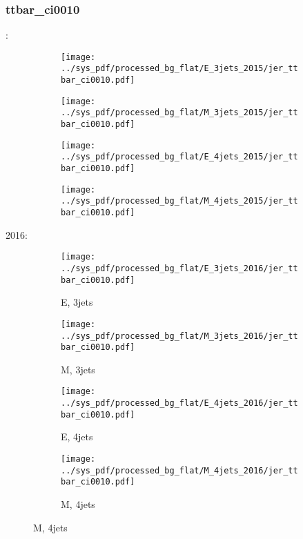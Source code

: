 \documentclass{beamer}
\begin{document}
\begin{frame}
\frametitle{ttbar_ci0010}
\fontsize{5}{1}:
\begin{figure}
\centering
\begin{subfigure}[b]{0.24\textwidth}
\texttt{[image: ../sys\_pdf/processed\_bg\_flat/E\_3jets\_2015/jer\_ttbar\_ci0010.pdf]}
\end{subfigure}
\begin{subfigure}[b]{0.24\textwidth}
\texttt{[image: ../sys\_pdf/processed\_bg\_flat/M\_3jets\_2015/jer\_ttbar\_ci0010.pdf]}
\end{subfigure}
\begin{subfigure}[b]{0.24\textwidth}
\texttt{[image: ../sys\_pdf/processed\_bg\_flat/E\_4jets\_2015/jer\_ttbar\_ci0010.pdf]}
\end{subfigure}
\begin{subfigure}[b]{0.24\textwidth}
\texttt{[image: ../sys\_pdf/processed\_bg\_flat/M\_4jets\_2015/jer\_ttbar\_ci0010.pdf]}
\end{subfigure}
\end{figure}
2016:
\begin{figure}
\centering
\begin{subfigure}[b]{0.24\textwidth}
\texttt{[image: ../sys\_pdf/processed\_bg\_flat/E\_3jets\_2016/jer\_ttbar\_ci0010.pdf]}
\captionsetup{font=tiny}
\caption{E, 3jets}
\end{subfigure}
\begin{subfigure}[b]{0.24\textwidth}
\texttt{[image: ../sys\_pdf/processed\_bg\_flat/M\_3jets\_2016/jer\_ttbar\_ci0010.pdf]}
\captionsetup{font=tiny}
\caption{M, 3jets}
\end{subfigure}
\begin{subfigure}[b]{0.24\textwidth}
\texttt{[image: ../sys\_pdf/processed\_bg\_flat/E\_4jets\_2016/jer\_ttbar\_ci0010.pdf]}
\captionsetup{font=tiny}
\caption{E, 4jets}
\end{subfigure}
\begin{subfigure}[b]{0.24\textwidth}
\texttt{[image: ../sys\_pdf/processed\_bg\_flat/M\_4jets\_2016/jer\_ttbar\_ci0010.pdf]}
\captionsetup{font=tiny}
\caption{M, 4jets}
\end{subfigure}
\end{figure}
\end{frame}
\end{document}
